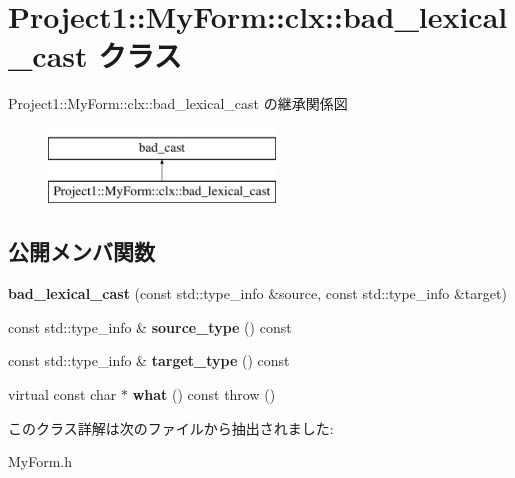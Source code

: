 \hypertarget{class_project1_1_1_my_form_1_1clx_1_1bad__lexical__cast}{}\section{Project1\+:\+:My\+Form\+:\+:clx\+:\+:bad\+\_\+lexical\+\_\+cast クラス}
\label{class_project1_1_1_my_form_1_1clx_1_1bad__lexical__cast}
Project1\+:\+:My\+Form\+:\+:clx\+:\+:bad\+\_\+lexical\+\_\+cast の継承関係図\begin{figure}[H]
\begin{center}
\leavevmode
\includegraphics[height=2.000000cm]{class_project1_1_1_my_form_1_1clx_1_1bad__lexical__cast}
\end{center}
\end{figure}
\subsection*{公開メンバ関数}
\begin{DoxyCompactItemize}
\item 
\mbox{\label{class_project1_1_1_my_form_1_1clx_1_1bad__lexical__cast_a29c933b0a71e3390a729febcc4359635}} 
{\bfseries bad\+\_\+lexical\+\_\+cast} (const std\+::type\+\_\+info \&source, const std\+::type\+\_\+info \&target)
\item 
\mbox{\label{class_project1_1_1_my_form_1_1clx_1_1bad__lexical__cast_ac753f53410a8a4ed06c21654ce76d5b3}} 
const std\+::type\+\_\+info \& {\bfseries source\+\_\+type} () const
\item 
\mbox{\label{class_project1_1_1_my_form_1_1clx_1_1bad__lexical__cast_ae0b07193cfe892db01fc8b4fb236d495}} 
const std\+::type\+\_\+info \& {\bfseries target\+\_\+type} () const
\item 
\mbox{\label{class_project1_1_1_my_form_1_1clx_1_1bad__lexical__cast_a0935bb29f2da56fd7e44d398769cef4a}} 
virtual const char $\ast$ {\bfseries what} () const  throw ()
\end{DoxyCompactItemize}


このクラス詳解は次のファイルから抽出されました\+:\begin{DoxyCompactItemize}
\item 
My\+Form.\+h\end{DoxyCompactItemize}

